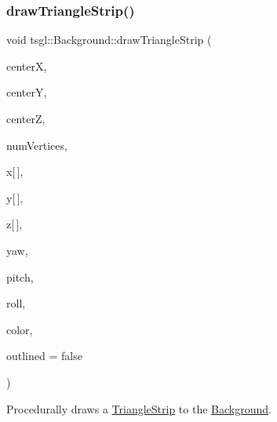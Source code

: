 \subsubsection{\texorpdfstring{draw\+Triangle\+Strip()}{drawTriangleStrip()}\hspace{0.1cm}{\footnotesize\ttfamily [1/2]}}
{\footnotesize\ttfamily void tsgl\+::\+Background\+::draw\+Triangle\+Strip (\begin{DoxyParamCaption}\item[{float}]{centerX,  }\item[{float}]{centerY,  }\item[{float}]{centerZ,  }\item[{int}]{num\+Vertices,  }\item[{float}]{x\mbox{[}$\,$\mbox{]},  }\item[{float}]{y\mbox{[}$\,$\mbox{]},  }\item[{float}]{z\mbox{[}$\,$\mbox{]},  }\item[{float}]{yaw,  }\item[{float}]{pitch,  }\item[{float}]{roll,  }\item[{\hyperlink{structtsgl_1_1_color_float}{Color\+Float}}]{color,  }\item[{bool}]{outlined = {\ttfamily false} }\end{DoxyParamCaption})\hspace{0.3cm}{\ttfamily [virtual]}}



Procedurally draws a \hyperlink{classtsgl_1_1_triangle_strip}{Triangle\+Strip} to the \hyperlink{classtsgl_1_1_background}{Background}. 


